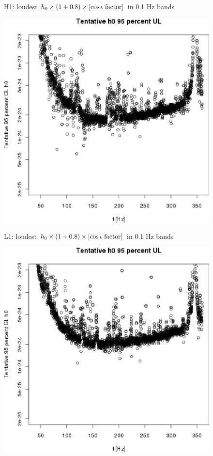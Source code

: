 \begin{figure}
\caption{\protect\includegraphics[width=0.4\paperwidth,height=0.2\paperheight]{plots/h0FullUL95logGuess-H1.eps}}
H1: loudest $h_0 \times \left( 1 + 0.8 \right) \times \left[\cos \iota \textup{ factor}\right]$ in 0.1 Hz bands
\end{figure}

\begin{figure}
\caption{\protect\includegraphics[width=0.4\paperwidth,height=0.2\paperheight]{plots/h0FullUL95logGuess-L1.eps}}
L1: loudest $h_0 \times \left( 1 + 0.8 \right) \times \left[\cos \iota \textup{ factor}\right]$ in 0.1 Hz bands
\end{figure}

